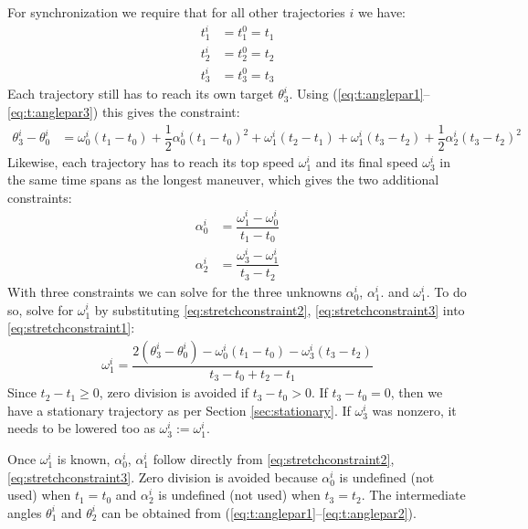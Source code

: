 \documentclass[12pt, a4paper]
{article}
\providecommand{\lr}[1]{\left(#1\right)}
\providecommand{\w}{\omega}
\renewcommand{\th}{\theta}
\renewcommand{\a}{\alpha}
\begin{document}
For synchronization we require that for all other trajectories $i$ we have:
%
\begin{align}
    t^i_1 &= t^0_1=t_1\\[1em]
    t^i_2 &= t^0_2=t_2\\[1em]
    t^i_3 &= t^0_3=t_3
\end{align}
%
Each trajectory still has to reach its own target $\th^i_3$.
Using (\ref{eq:t:anglepar1}--\ref{eq:t:anglepar3}) this gives the constraint:
%
\begin{align}
    \label{eq:stretchconstraint1}
    \th^i_3 - \th^i_0  &=  \w^i_0(t_1-t_0)+\dfrac{1}{2}\a^i_0(t_1-t_0)^2+
        \w^i_1(t_2-t_1)+ \w^i_1(t_3-t_2)+\dfrac{1}{2}\a^i_2(t_3-t_2)^2    
\end{align}
%
Likewise, each trajectory has to reach its top speed $\w^i_1$ and its final
speed $\w^i_3$ in the same time spans as the longest maneuver, which gives the
two additional constraints:
%
\begin{align}
    \label{eq:stretchconstraint2}
    \a^i_0 &= \dfrac{\w^i_1-\w_0^i}{t_1 - t_0}\\[1em]
    \label{eq:stretchconstraint3}
    \a_2^i &= \dfrac{\w_3^i-\w_1^i}{t_3 - t_2}
\end{align}
%
With three constraints we can solve for the three unknowns $\a^i_0$, $\a^i_1$.
and $\w^i_1$. To do so, solve for $\w^i_1$ by substituting
\eqref{eq:stretchconstraint2}, \eqref{eq:stretchconstraint3} into
\eqref{eq:stretchconstraint1}:
%
\begin{align}
    \label{eq:stretchconstraintsolved}
    \w^i_1 = \dfrac{2\lr{\th_3^i-\th_0^i}-\w_0^i\lr{t_1-t_0} -
    \w_3^i\lr{t_3-t_2}}{t_3-t_0 + t_2 - t_1}
\end{align}
%
Since $t_2 - t_1 \geq 0$, zero division is avoided if $t_3 - t_0 > 0$. If $t_3
- t_0 = 0$, then we have a stationary trajectory as per Section
\ref{sec:stationary}. If $\w_3^i$ was nonzero, it needs to be lowered
too as $\w_3^i := \w_1^i$.

Once $\w^i_1$ is known, $\a^i_0$, $\a^i_1$ follow directly from
\eqref{eq:stretchconstraint2}, \eqref{eq:stretchconstraint3}. Zero division is
avoided because $\a^i_0$ is undefined (not used) when $t_1 = t_0$ and $\a^i_2$
is undefined (not used) when $t_3 = t_2$. The intermediate angles $\th_1^i$
and $\th_2^i$ can be obtained from
(\ref{eq:t:anglepar1}--\ref{eq:t:anglepar2}).
\end{document}
